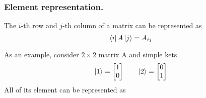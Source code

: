 \documentclass[../main.tex]{subfiles}
\begin{document}
\subsubsection{Element representation.}
The $i$-th row and $j$-th column of a matrix can be represented as 
\begin{equation*}
	\bra{i }A \ket{j }=A_{ij}
\end{equation*}

As an example, consider $2 \times 2$ matrix A and simple kets 
\begin{equation*}
	\ket{1}=
	\begin{bmatrix}
		1\\
		0	
	\end{bmatrix} 
	\qquad
	\ket{2}=
	\begin{bmatrix}
		0\\
		1
	\end{bmatrix} 
\end{equation*}
All of its element can be represented as 
\end{document}
